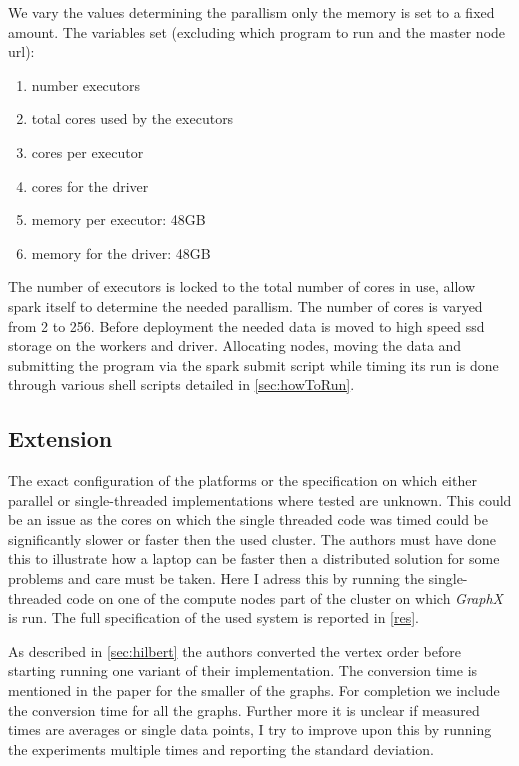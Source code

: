 We vary the values determining the parallism only the memory is set to a fixed amount. The variables set (excluding which program to run and the master node url):

\begin{multicols}{2}
\begin{enumerate}
	\item number executors
	\item total cores used by the executors
	\item cores per executor
	\item cores for the driver
	\item memory per executor: 48GB
	\item memory for the driver: 48GB
\end{enumerate}
\end{multicols}

The number of executors is locked to the total number of cores in use, allow spark itself to determine the needed parallism. The number of cores is varyed from 2 to 256. Before deployment the needed data is moved to high speed ssd storage on the workers and driver. 
Allocating nodes, moving the data and submitting the program via the spark submit script while timing its run is done through various shell scripts detailed in \cref{sec:howToRun}.

\subsection{Extension}
The exact configuration of the platforms or the specification on which either parallel or single-threaded implementations where tested are unknown. This could be an issue as the cores on which the single threaded code was timed could be significantly slower or faster then the used cluster. The authors must have done this to illustrate how a laptop can be faster then a distributed solution for some problems and care must be taken. Here I adress this by running the single-threaded code on one of the compute nodes part of the cluster on which \textit{GraphX} is run. The full specification of the used system is reported in \cref{res}.

As described in \cref{sec:hilbert} the authors converted the vertex order before starting running one variant of their implementation. The conversion time is mentioned in the paper for the smaller of the graphs. For completion we include the conversion time for all the graphs. Further more it is unclear if measured times are averages or single data points, I try to improve upon this by running the experiments multiple times and reporting the standard deviation.
